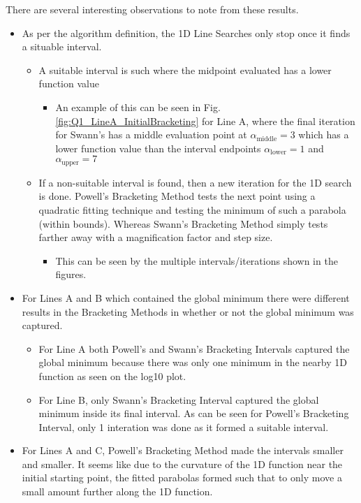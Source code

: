 \documentclass{article}
\begin{document}
    There are several interesting observations to note from these results.
    \begin{itemize}
        \item As per the algorithm definition, the 1D Line Searches only stop once it finds a situable interval.
        \begin{itemize}
            \item A suitable interval is such where the midpoint evaluated has a lower function value
            \begin{itemize}
                \item An example of this can be seen in Fig. \ref{fig:Q1_LineA_InitialBracketing} for Line A, where the final iteration for Swann's has a middle evaluation point at $\alpha_{\text{middle}} = 3$ which has a lower function value than the interval endpoints $\alpha_{\text{lower}} = 1$ and $\alpha_{\text{upper}} = 7$
            \end{itemize}
            \item If a non-suitable interval is found, then a new iteration for the 1D search is done. Powell's Bracketing Method tests the next point using a quadratic fitting technique and testing the minimum of such a parabola (within bounds). Whereas Swann's Bracketing Method simply tests farther away with a magnification factor and step size.
            \begin{itemize}
                \item This can be seen by the multiple intervals/iterations shown in the figures.
            \end{itemize}
        \end{itemize}
        \item For Lines A and B which contained the global minimum there were different results in the Bracketing Methods in whether or not the global minimum was captured.
        \begin{itemize}
            \item For Line A both Powell's and Swann's Bracketing Intervals captured the global minimum because there was only one minimum in the nearby 1D function as seen on the log10 plot.
            \item For Line B, only Swann's Bracketing Interval captured the global minimum inside its final interval. As can be seen for Powell's Bracketing Interval, only 1 interation was done as it formed a suitable interval.
        \end{itemize}
        \item For Lines A and C, Powell's Bracketing Method made the intervals smaller and smaller. It seems like due to the curvature of the 1D function near the initial starting point, the fitted parabolas formed such that to only move a small amount further along the 1D function.

\end{itemize}
\end{document}
